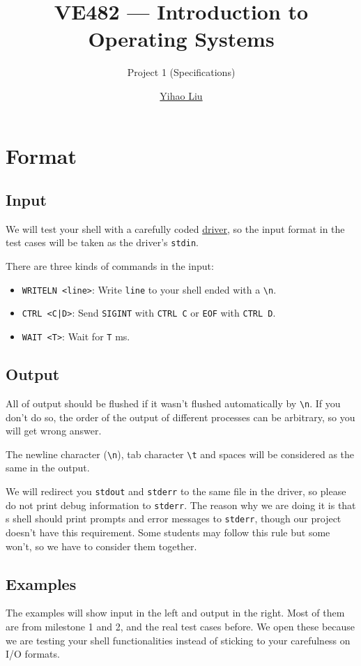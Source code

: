 \documentclass[11pt,a4paper]{article}
\title{VE482 --- Introduction to\\ Operating Systems}
\subtitle{Project 1 (Specifications)}
\author{\href{mailto:liuyh615@sjtu.edu.cn}{Yihao Liu}}
\begin{document}
\maketitle

\section{Format}

\subsection{Input}
We will test your shell with a carefully coded \href{https://github.com/tc-imba/VE482-FA2018-public/blob/master/p1/driver/driver.c}{driver}, so the input format in the test cases will be taken as the driver's \texttt{stdin}. \bigskip

There are three kinds of commands in the input: 
\begin{itemize}
\item \texttt{WRITELN <line>}: Write \texttt{line} to your shell ended with a \texttt{\textbackslash n}.
\item \texttt{CTRL <C|D>}: Send \texttt{SIGINT} with \texttt{CTRL C} or \texttt{EOF} with \texttt{CTRL D}.
\item \texttt{WAIT <T>}: Wait for \texttt{T} ms.
\end{itemize}

\subsection{Output}
All of output should be flushed if it wasn't flushed automatically by \texttt{\textbackslash n}. If you don't do so, the order of the output of different processes can be arbitrary, so you will get wrong answer. \bigskip

The newline character (\texttt{\textbackslash n}), tab character \texttt{\textbackslash t} and spaces will be considered as the same in the output. \bigskip

We will redirect you \texttt{stdout} and \texttt{stderr} to the same file in the driver, so please do not print debug information to \texttt{stderr}. The reason why we are doing it is that s shell should print prompts and error messages to \texttt{stderr}, though our project doesn't have this requirement. Some students may follow this rule but some won't, so we have to consider them together.

\subsection{Examples}
The examples will show input in the left and output in the right. Most of them are from milestone 1 and 2, and the real test cases before. We open these because we are testing your shell functionalities instead of sticking to your carefulness on I/O formats.
\end{document}
